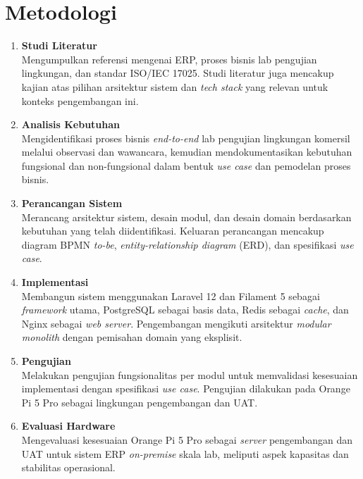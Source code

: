 \section{Metodologi}
\begin{enumerate}
    \item \textbf{Studi Literatur} \\
      Mengumpulkan referensi mengenai ERP, proses bisnis lab pengujian lingkungan, dan standar ISO/IEC 17025. Studi literatur juga mencakup kajian atas pilihan arsitektur sistem dan \textit{tech stack} yang relevan untuk konteks pengembangan ini.

    \item \textbf{Analisis Kebutuhan} \\
      Mengidentifikasi proses bisnis \textit{end-to-end} lab pengujian lingkungan komersil melalui observasi dan wawancara, kemudian mendokumentasikan kebutuhan fungsional dan non-fungsional dalam bentuk \textit{use case} dan pemodelan proses bisnis.

    \item \textbf{Perancangan Sistem} \\
      Merancang arsitektur sistem, desain modul, dan desain domain berdasarkan kebutuhan yang telah diidentifikasi. Keluaran perancangan mencakup diagram BPMN \textit{to-be}, \textit{entity-relationship diagram} (ERD), dan spesifikasi \textit{use case}.

    \item \textbf{Implementasi} \\
      Membangun sistem menggunakan Laravel 12 dan Filament 5 sebagai \textit{framework} utama, PostgreSQL sebagai basis data, Redis sebagai \textit{cache}, dan Nginx sebagai \textit{web server}. Pengembangan mengikuti arsitektur \textit{modular monolith} dengan pemisahan domain yang eksplisit.

    \item \textbf{Pengujian} \\
      Melakukan pengujian fungsionalitas per modul untuk memvalidasi kesesuaian implementasi dengan spesifikasi \textit{use case}. Pengujian dilakukan pada Orange Pi 5 Pro sebagai lingkungan pengembangan dan UAT.

    \item \textbf{Evaluasi Hardware} \\
      Mengevaluasi kesesuaian Orange Pi 5 Pro sebagai \textit{server} pengembangan dan UAT untuk sistem ERP \textit{on-premise} skala lab, meliputi aspek kapasitas dan stabilitas operasional.
\end{enumerate}